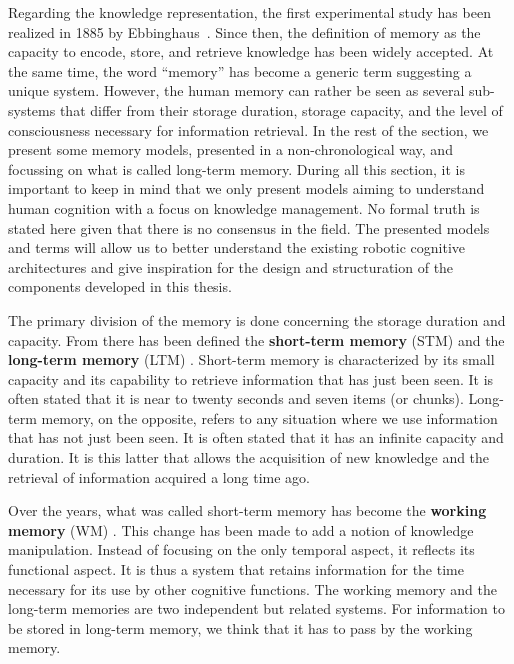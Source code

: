 Regarding the knowledge representation, the first experimental study has been realized in 1885 by Ebbinghaus~\cite{ebbinghaus_1885_gedachtnis}. Since then, the definition of memory as the capacity to encode, store, and retrieve knowledge \cite{roediger_1996_retrieval} has been widely accepted. At the same time, the word ``memory'' has become a generic term suggesting a unique system. However, the human memory can rather be seen as several sub-systems that differ from their storage duration, storage capacity, and the level of consciousness necessary for information retrieval. In the rest of the section, we present some memory models, presented in a non-chronological way, and focussing on what is called long-term memory. During all this section, it is important to keep in mind that we only present models aiming to understand human cognition with a focus on knowledge management. No formal truth is stated here given that there is no consensus in the field. The presented models and terms will allow us to better understand the existing robotic cognitive architectures and give inspiration for the design and structuration of the components developed in this thesis.

The primary division of the memory is done concerning the storage duration and capacity. From there has been defined the \textbf{short-term memory} (STM) and the \textbf{long-term memory} (LTM) \cite{atkinson_1966_some}. Short-term memory is characterized by its small capacity and its capability to retrieve information that has just been seen. It is often stated that it is near to twenty seconds and seven items (or chunks)\cite{miller_1956_human}. Long-term memory, on the opposite, refers to any situation where we use information that has not just been seen. It is often stated that it has an infinite capacity and duration. It is this latter that allows the acquisition of new knowledge and the retrieval of information acquired a long time ago.

Over the years, what was called short-term memory has become the \textbf{working memory} (WM) \cite{baddeley_1986_dementia}. This change has been made to add a notion of knowledge manipulation. Instead of focusing on the only temporal aspect, it reflects its functional aspect. It is thus a system that retains information for the time necessary for its use by other cognitive functions. The working memory and the long-term memories are two independent but related systems. For information to be stored in long-term memory, we think that it has to pass by the working memory.

